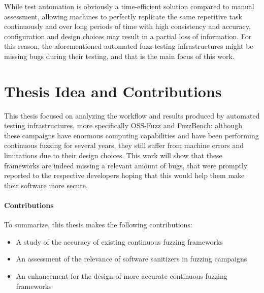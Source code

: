 While test automation is obviously a time-efficient solution compared to manual assessment, allowing machines to perfectly replicate the same repetitive task continuously and over long periods of time with high consistency and accuracy, configuration and design choices may result in a partial loss of information. For this reason, the aforementioned automated fuzz-testing infrastructures might be missing bugs during their testing, and that is the main focus of this work.  




\section{Thesis Idea and Contributions}


This thesis focused on analyzing the workflow and results produced by automated testing infrastructures, more specifically OSS-Fuzz and FuzzBench: although these campaigns have enormous computing capabilities and have been performing continuous fuzzing for several years, they still suffer from machine errors and limitations due to their design choices. This work will show that these frameworks are indeed missing a relevant amount of bugs, that were promptly reported to the respective developers hoping that this would help them make their software more secure.


\paragraph{Contributions}
To summarize, this thesis makes the following contributions:
\begin{itemize}
    \item A study of the accuracy of existing continuous fuzzing frameworks
    \item An assessment of the relevance of software sanitizers in fuzzing campaigns
    \item An enhancement for the design of more accurate continuous fuzzing frameworks
\end{itemize}




